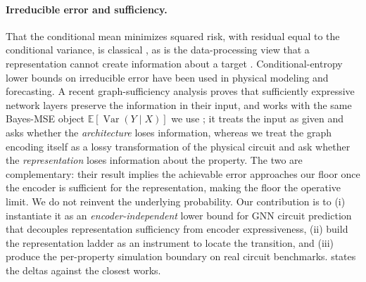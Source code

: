\documentclass[10pt]{article}
\newcommand{\E}{\mathbb{E}}
\newcommand{\Var}{\operatorname{Var}}
\begin{document}
\paragraph{Irreducible error and sufficiency.}
That the conditional mean minimizes squared risk, with residual equal to the conditional variance, is classical \citep{hastie2009esl,devroye1996probabilistic}, as is the data-processing view that a representation cannot create information about a target \citep{cover2006information}. Conditional-entropy lower bounds on irreducible error have been used in physical modeling \citep{dimensionless2025irreducible} and forecasting. A recent graph-sufficiency analysis proves that sufficiently expressive network layers preserve the information in their input, and works with the same Bayes-MSE object $\E[\Var(Y\mid X)]$ we use \citep{shen2025graphsufficiency}; it treats the input as given and asks whether the \emph{architecture} loses information, whereas we treat the graph encoding itself as a lossy transformation of the physical circuit and ask whether the \emph{representation} loses information about the property. The two are complementary: their result implies the achievable error approaches our floor once the encoder is sufficient for the representation, making the floor the operative limit. We do not reinvent the underlying probability. Our contribution is to (i) instantiate it as an \emph{encoder-independent} lower bound for GNN circuit prediction that decouples representation sufficiency from encoder expressiveness, (ii) build the representation ladder as an instrument to locate the transition, and (iii) produce the per-property simulation boundary on real circuit benchmarks.  states the deltas against the closest works.
\end{document}
